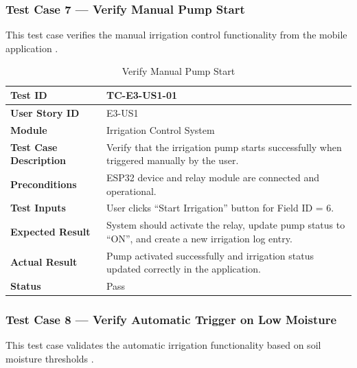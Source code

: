 \subsubsection{Test Case 7 --- Verify Manual Pump Start}

This test case verifies the manual irrigation control functionality 
from the mobile application \cite{iotsmartag2024}.

\begin{longtable}{|p{4cm}|p{8cm}|}
\caption{Verify Manual Pump Start}
\label{tab:tc_pump} \\
\hline
\textbf{Test ID} & TC-E3-US1-01 \\ \hline
\textbf{User Story ID} & E3-US1 \\ \hline
\textbf{Module} & Irrigation Control System \\ \hline
\textbf{Test Case Description} & Verify that the irrigation pump 
starts successfully when triggered manually by the user. \\ \hline
\textbf{Preconditions} & ESP32 device and relay module are connected 
and operational. \\ \hline
\textbf{Test Inputs} & User clicks ``Start Irrigation'' button for 
Field ID = 6. \\ \hline
\textbf{Expected Result} & System should activate the relay, update 
pump status to ``ON'', and create a new irrigation log entry. \\ 
\hline
\textbf{Actual Result} & Pump activated successfully and irrigation 
status updated correctly in the application. \\ \hline
\textbf{Status} & Pass \\ \hline
\end{longtable}

\subsubsection{Test Case 8 --- Verify Automatic Trigger on Low 
Moisture}

This test case validates the automatic irrigation functionality 
based on soil moisture thresholds \cite{garcia2020iot}.

